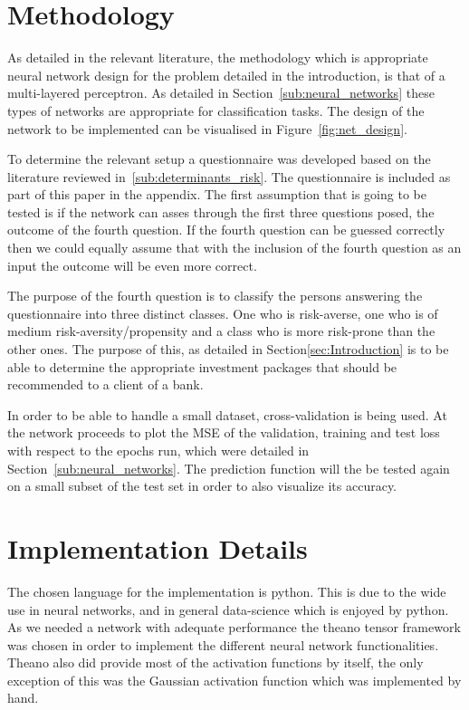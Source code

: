\documentclass{article}
\begin{document}
\section{Methodology}
\label{sec:methodology}

As detailed in the relevant literature, the methodology which is appropriate neural network design for the problem detailed in the introduction, is that of a multi-layered perceptron. As detailed in Section~\ref{sub:neural_networks} these types of networks are appropriate for classification tasks. The design of the network to be implemented can be visualised in Figure~\ref{fig:net_design}. 

To determine the relevant setup a questionnaire was developed based on the literature reviewed in~\ref{sub:determinants_risk}. The questionnaire is included as part of this paper in the appendix. The first assumption that is going to be tested is if the network can asses through the first three questions posed, the outcome of the fourth question. If the fourth question can be guessed correctly then we could equally assume that with the inclusion of the fourth question as an input the outcome will be even more correct. 

The purpose of the fourth question is to classify the persons answering the questionnaire into three distinct classes. One who is risk-averse, one who is of medium risk-aversity/propensity and a class who is more risk-prone than the other ones. The purpose of this, as detailed in Section\ref{sec:Introduction} is to be able to determine the appropriate investment packages that should be recommended to a client of a bank.

In order to be able to handle a small dataset, cross-validation is being used. At the network proceeds to plot the MSE of the validation, training and test loss with respect to the epochs run, which were detailed in Section~\ref{sub:neural_networks}. The prediction function will the be tested again on a small subset of the test set in order to also visualize its accuracy.
\section{Implementation Details}
\label{sec:implementation_details}

The chosen language for the implementation is python. This is due to the wide use in neural networks, and in general data-science which is enjoyed by python. As we needed a network with adequate performance the theano tensor framework was chosen in order to implement the different neural network functionalities. Theano also did provide most of the activation functions by itself, the only exception of this was the Gaussian activation function which was implemented by hand.
\end{document}
